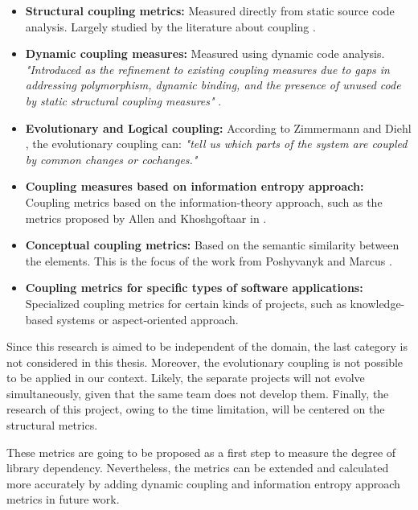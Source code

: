 \begin{itemize}
  \item \textbf{Structural coupling metrics:} Measured directly from static source code analysis. Largely studied by the literature about coupling \cite{briand1999unified, poshyvanyk2006conceptual, briand1997investigation, eder1994coupling}.

  \item \textbf{Dynamic coupling measures:} Measured using dynamic code analysis. \textit{"Introduced as the refinement to existing coupling measures due to gaps in addressing polymorphism, dynamic binding, and the presence of unused code by static structural coupling measures"} \cite{poshyvanyk2006conceptual}.

  \item \textbf{Evolutionary and Logical coupling:} According to Zimmermann and Diehl \cite{zimmermann2005mining}, the evolutionary coupling can: \textit{"tell us which parts of the system are coupled by common changes or cochanges."}

  \item \textbf{Coupling measures based on information entropy approach:} Coupling metrics based on the information-theory approach, such as the metrics proposed by Allen and Khoshgoftaar in \cite{allen1999measuring}.

  \item \textbf{Conceptual coupling metrics:} Based on the semantic similarity between the elements. This is the focus of the work from Poshyvanyk and Marcus \cite{poshyvanyk2006conceptual}.

  \item \textbf{Coupling metrics for specific types of software applications:} Specialized coupling metrics for certain kinds of projects, such as knowledge-based systems or aspect-oriented approach.
\end{itemize}

\blankl
Since this research is aimed to be independent of the domain, the last category is not considered in this thesis. Moreover, the evolutionary coupling is not possible to be applied in our context. Likely, the separate projects will not evolve simultaneously, given that the same team does not develop them. Finally, the research of this project, owing to the time limitation, will be centered on the structural metrics.

These metrics are going to be proposed as a first step to measure the degree of library dependency. Nevertheless, the metrics can be extended and calculated more accurately by adding dynamic coupling and information entropy approach metrics in future work.

